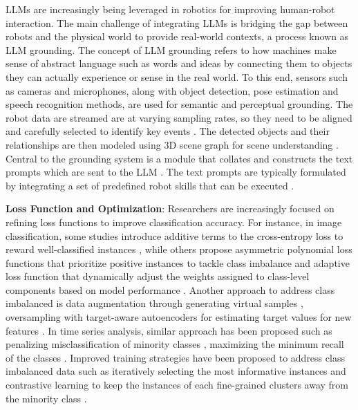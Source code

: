\documentclass[preprint,12pt]{elsarticle}
\begin{document}
LLMs are increasingly being leveraged in robotics for improving human-robot interaction. The main challenge of integrating LLMs is bridging the gap between robots and the physical world to provide real-world contexts, a process known as LLM grounding. The concept of LLM grounding refers to how machines make sense of abstract language such as words and ideas by connecting them to objects they can actually experience or sense in the real world. To this end, sensors such as cameras and microphones, along with object detection, pose estimation and speech recognition methods, are used for semantic and perceptual grounding. The robot data are streamed are at varying sampling rates, so they need to be aligned and carefully selected to identify key events \citep{wang_i_2024}. The detected objects and their relationships are then modeled using 3D scene graph for scene understanding \citep{chen_synergai_2024}. Central to the grounding system is a module that collates and constructs the text prompts which are sent to the LLM \citep{allgeuer_when_2024}. The text prompts are typically formulated by integrating a set of predefined robot skills that can be executed \citep{asuzu_humanrobot_2025}.

\textbf{Loss Function and Optimization}: Researchers are increasingly focused on refining loss functions to improve classification accuracy. For instance, in image classification, some studies introduce additive terms to the cross-entropy loss to reward well-classified instances \citep{zhao_well-classified_2022}, while others propose asymmetric polynomial loss functions that prioritize positive instances to tackle class imbalance \citep{huang_asymmetric_2023} and adaptive loss function that dynamically adjust the weights assigned to class-level components based on model performance \citep{maldonado2023owadapt}. Another approach to address class imbalanced is data augmentation through generating virtual samples \citep{zhu2024irda}, oversampling with target-aware autoencoders for estimating target values for new features \citep{belhaouari2024oversampling}. In time series analysis, similar approach has been proposed such as penalizing misclassification of minority classes \citep{wang2024class}, maximizing the minimum recall of the classes \citep{ircio2023minimum}. Improved training strategies have been proposed to address class imbalanced data such as iteratively selecting the most informative instances \citep{moles2024exploring} and contrastive learning to keep the instances of each fine-grained clusters away from the minority class \citep{zhu2024sfpl}.
\end{document}
